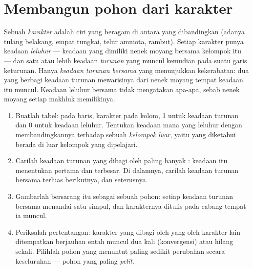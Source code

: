 \section{Membangun pohon dari karakter}

\begin{definition}\label{def:g12:phylogenetic-trees:states}
Sebuah \emph{karakter} adalah ciri yang beragam di antara  yang
dibandingkan (adanya tulang belakang, empat tungkai, telur amniota,
rambut). Setiap karakter punya keadaan \emph{leluhur} --- keadaan yang
dimiliki nenek moyang bersama kelompok itu --- dan satu atau lebih
keadaan \emph{turunan} yang muncul kemudian pada suatu garis
keturunan. Hanya \emph{keadaan turunan bersama} yang menunjukkan
kekerabatan: dua  yang berbagi keadaan turunan mewarisinya dari
nenek moyang tempat keadaan itu muncul. Keadaan leluhur bersama tidak
mengatakan apa-apa, sebab nenek moyang setiap makhluk memilikinya.
\end{definition}

\begin{method}\label{met:g12:phylogenetic-trees:build}
\begin{enumerate}
  \item Buatlah tabel:  pada baris, karakter pada kolom, 1
        untuk keadaan turunan dan 0 untuk keadaan leluhur. Tentukan
        keadaan mana yang leluhur dengan membandingkannya terhadap
        sebuah \emph{kelompok luar}, yaitu  yang diketahui
        berada di luar kelompok yang dipelajari.
  \item Carilah keadaan turunan yang dibagi oleh paling banyak
        : keadaan itu menentukan  pertama dan terbesar. Di
        dalamnya, carilah keadaan turunan bersama terluas berikutnya,
        dan seterusnya.
  \item Gambarlah  bersarang itu sebagai sebuah pohon: setiap
        keadaan turunan bersama menandai satu simpul, dan karakternya
        ditulis pada cabang tempat ia muncul.
  \item Periksalah pertentangan: karakter yang dibagi oleh 
        yang oleh karakter lain ditempatkan berjauhan entah muncul dua
        kali (konvergensi) atau hilang sekali. Pilihlah pohon yang
        menuntut paling sedikit perubahan secara keseluruhan --- pohon
        yang paling \emph{pelit}.
\end{enumerate}
\end{method}

